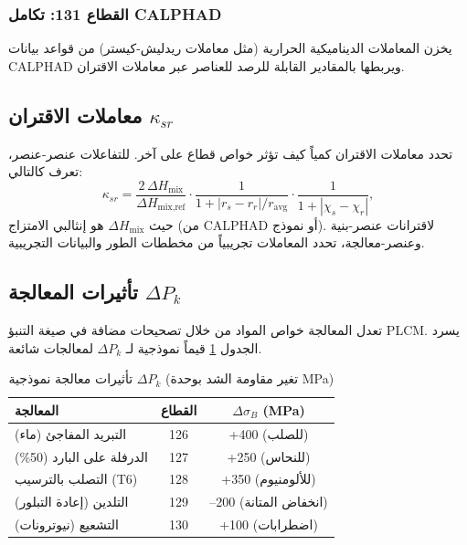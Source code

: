 \documentclass[11pt,a4paper]{article}
\begin{document}
\begin{otherlanguage}{arabic}
		\subsubsection{القطاع 131: تكامل CALPHAD}
		يخزن المعاملات الديناميكية الحرارية (مثل معاملات ريدليش-كيستر) من قواعد بيانات CALPHAD ويربطها بالمقادير القابلة للرصد للعناصر عبر معاملات الاقتران.
		
		\subsection{معاملات الاقتران \(\kappa_{sr}\)}
		
		تحدد معاملات الاقتران كمياً كيف تؤثر خواص قطاع على آخر. للتفاعلات عنصر-عنصر، تعرف كالتالي:
		\[
		\kappa_{sr} = \frac{2\,\Delta H_{\text{mix}}}{\Delta H_{\text{mix,ref}}} \cdot
		\frac{1}{1 + |r_s - r_r|/r_{\text{avg}}} \cdot
		\frac{1}{1 + |\chi_s - \chi_r|},
		\]
		حيث \(\Delta H_{\text{mix}}\) هو إنثالبي الامتزاج (من CALPHAD أو نموذج). لاقترانات عنصر-بنية وعنصر-معالجة، تحدد المعاملات تجريبياً من مخططات الطور والبيانات التجريبية.
		
		\subsection{تأثيرات المعالجة \(\Delta P_k\)}
		\label{sec:processing}
		
		تعدل المعالجة خواص المواد من خلال تصحيحات مضافة في صيغة التنبؤ PLCM. يسرد الجدول \ref{tab:processing-effects} قيماً نموذجية لـ \(\Delta P_k\) لمعالجات شائعة.
		
		\begin{table}[htbp]
			\centering
			\caption{تأثيرات معالجة نموذجية \(\Delta P_k\) (تغير مقاومة الشد بوحدة MPa)}
			\label{tab:processing-effects}
			\begin{tabular}{lcc}
				\toprule
				المعالجة & القطاع & \(\Delta \sigma_B\) (MPa) \\
				\midrule
				التبريد المفاجئ (ماء) & 126 & +400 (للصلب) \\
				الدرفلة على البارد (50\%) & 127 & +250 (للنحاس) \\
				التصلب بالترسيب (T6) & 128 & +350 (للألومنيوم) \\
				التلدين (إعادة التبلور) & 129 & –200 (انخفاض المتانة) \\
				التشعيع (نيوترونات) & 130 & +100 (اضطرابات) \\
				\bottomrule
			\end{tabular}
		\end{table}
		

\end{otherlanguage}
\end{document}
